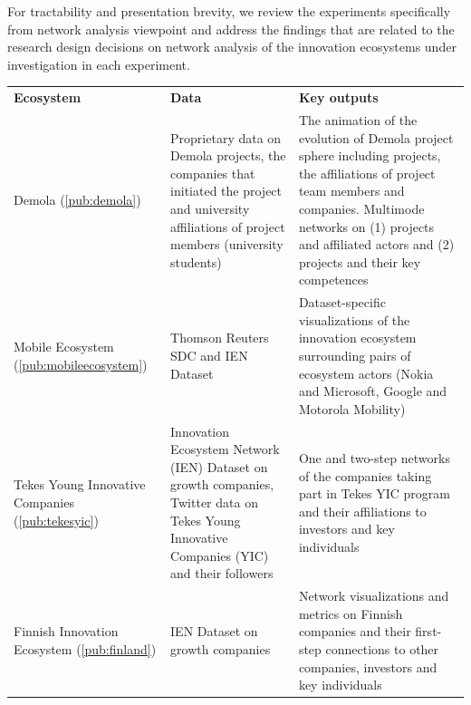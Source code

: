 For tractability and presentation brevity, we review the experiments specifically from network analysis viewpoint and address the findings that are related to the research design decisions on network analysis of the innovation ecosystems under investigation in each experiment.

\begingroup
{}\label{tab:experiments}
\begin{tabular}{p{2.5cm} p{4cm} p{5.5cm}}
\textbf{Ecosystem} 
& \textbf{Data} 
& \textbf{Key outputs} \\

Demola (\ref{pub:demola}) &
Proprietary data on Demola projects, the companies that initiated the project and university affiliations of project members (university students) & 
The animation of the evolution of Demola project sphere including projects, the affiliations of project team members and companies. Multimode networks on (1) projects and affiliated actors and (2) projects and their key competences \\

Mobile Ecosystem (\ref{pub:mobileecosystem}) &
Thomson Reuters SDC and IEN Dataset  & 
Dataset-specific visualizations of the innovation ecosystem surrounding pairs of ecosystem actors (Nokia and Microsoft, Google and Motorola Mobility) \\

Tekes Young Innovative Companies (\ref{pub:tekesyic})  &
Innovation Ecosystem Network (IEN) Dataset on growth companies, Twitter data on Tekes Young Innovative Companies (YIC) and their followers & 
One and two-step networks of the companies taking part in Tekes YIC program and their affiliations to investors and key individuals \\

Finnish Innovation Ecosystem (\ref{pub:finland}) & 
IEN Dataset on growth companies & 
Network visualizations and metrics on Finnish companies and their first-step connections to other companies, investors and key individuals \\


\end{tabular}

